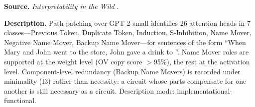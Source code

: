 
\textbf{Source.} \emph{Interpretability in the Wild} \citep{wang2023interpretability}.

\textbf{Description.} Path patching over GPT-2 small identifies 26 attention heads in 7 classes---Previous Token, Duplicate Token, Induction, S-Inhibition, Name Mover, Negative Name Mover, Backup Name Mover---for sentences of the form ``When Mary and John went to the store, John gave a drink to \underline{\hspace{0.9cm}}''. Name Mover roles are supported at the weight level (OV copy score $>$95\%), the rest at the activation level. Component-level redundancy (Backup Name Movers) is recorded under minimality (I3) rather than necessity: a circuit whose parts compensate for one another is still necessary as a circuit. Description mode: implementational-functional.

